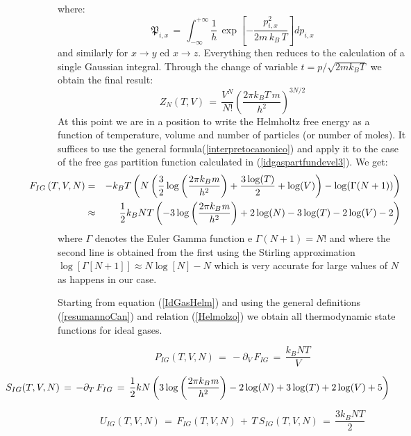\documentclass[10pt,a4paper]{article}
\begin{document}
where:
\begin{equation}\label{idgaspartfundevel2}
     \mathfrak{P}_{i,x} \, = \, \int_{-\infty}^{+\infty} \frac{1}{h} \, \exp\left[ - \frac{p_{i,x}^2}{2
     \mathit{m}\,k_B\, T}\right]dp_{i,x}
\end{equation}
and similarly for $x\to y$ ed $x\to z$. Everything then reduces to the calculation of a single Gaussian integral. Through
the change of variable $t=p/\sqrt{2\mathit{m}k_B T}$ we obtain the final result:
\begin{equation}\label{idgaspartfundevel3}
     Z_N(T,V) \, = \, \frac{ V^N}{N!}
   \left(\frac{2 \pi k_B T \,
   \mathit{m}}{h^2}\right)^{3 N/2}
\end{equation}
At this point we are in a position to write the Helmholtz free energy as a function of temperature, volume and
number of particles (or number of moles). It suffices to use the general formula(\ref{interpretocanonico}) and apply it to the
case of the free gas partition function calculated in
(\ref{idgaspartfundevel3}). We get:
\begin{eqnarray}\label{IdGasHelm}
\hspace{-36pt}    F_{IG}\left(T,V,N\right) & = &-k_B T \left(N \left(\frac{3}{2} \log \left(\frac{2 \pi
    k_B
   \mathit{m}}{h^2}\right)+\frac{3 \log (T)}{2}+\log (V)\right)-\log (\Gamma
   (N+1))\right)\nonumber\\
   &\approx& \frac{1}{2} k_B N T \left(-3 \log \left(\frac{2
   \pi  k_B \mathit{m}}{h^2}\right)+2 \log (N)-3
   \log (T)-2 \log (V)-2\right)
\end{eqnarray}
where $\Gamma$ denotes the Euler Gamma function e $\Gamma (N+1)=N!$
and where the second line is obtained from the first using the Stirling approximation $\log[\Gamma[N+1]]\approx N\log[N] -N$
which is very accurate for large values of $N$  as happens in our case.
\par
Starting from equation (\ref{IdGasHelm}) and using the general definitions (\ref{resumannoCan}) and relation
(\ref{Helmolzo}) we obtain all thermodynamic state functions for ideal gases.
\begin{description}\label{tabelIG}
  \item[{\sc Pressure)}]
  \begin{equation}\label{pressIG}
    P_{IG}(T,V,N) \, = \, - \partial_V \,F_{IG} \, = \,\frac{k_B N T}{V}
  \end{equation}
  \item[{\sc Entropy)}]
\begin{equation}\label{entropIG}
 \hspace{-72pt}   S_{IG}(T,V,N) \, = \, - \partial_T \,F_{IG} \, = \,\frac{1}{2} k N \left(3 \log \left(\frac{2 \pi
    k_B \mathit{m}}{h^2}\right)-2 \log (N)+3
   \log (T)+2 \log (V)+5\right)
  \end{equation}
  \item[{\sc Internal Energy)}]
\begin{equation}\label{internIG}
    U_{IG}(T,V,N) \, = \, F_{IG}\left(T,V,N\right)\, + \, T \, S_{IG}(T,V,N)\,
    = \, \frac{3 k_B N T}{2}
  \end{equation}
\end{description}
\end{document}
